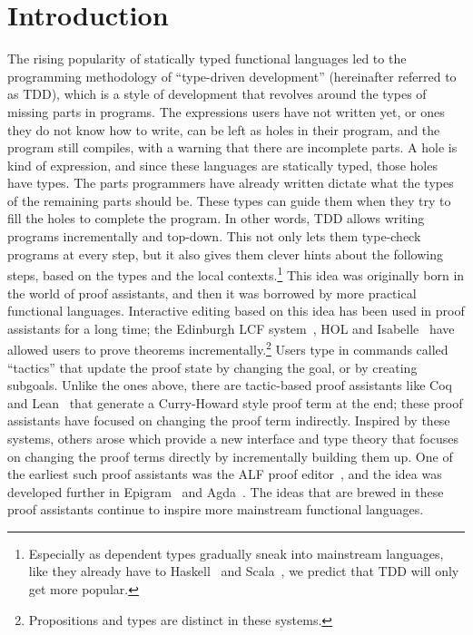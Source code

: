 \chapter{Introduction} \label{chap:introduction}

The rising popularity of statically typed functional languages led to
the programming methodology of ``type-driven development'' (hereinafter referred to as TDD),
which is a style of development that revolves around the types of missing parts in
programs. The expressions users have not written yet, or ones they do not know
how to write, can be left as holes in their program, and the program still
compiles, with a warning that there are incomplete parts.
A hole is kind of expression, and since these languages are
statically typed, those holes have types. The parts
programmers have already written dictate what the types of the remaining parts should
be. These types can guide them when they try to fill the holes to complete the program.
In other words, TDD allows writing programs incrementally and top-down. This
not only lets them type-check programs at every step, but it also gives them clever
hints about the following steps, based on the types and the local
contexts.\footnote{Especially as dependent types gradually sneak into
mainstream languages, like they already have to Haskell~\cite{eisenberg} and
Scala~\cite{scalaDep}, we predict that TDD will only get more popular.}
This idea was originally born in the world of proof assistants, and then it was
borrowed by more practical functional languages.
Interactive editing based on this idea has been used in proof assistants for a long
time; the Edinburgh LCF system~\cite{lcf}, HOL and
Isabelle~\cite{isabelle} have allowed users to prove theorems
incrementally.\footnote{Propositions and types are distinct in these systems.}
Users type in commands called ``tactics'' that update the proof state by
changing the goal, or by creating subgoals.
Unlike the ones above, there are tactic-based proof assistants like
Coq~\cite{coq} and Lean~\cite{lean} that generate a Curry-Howard style proof term at the end; these
proof assistants have focused on changing the proof term indirectly.
Inspired by these systems, others arose which
provide a new interface and type theory that focuses on
changing the proof terms directly by incrementally building them
up.
One of the earliest such proof assistants was the ALF proof
editor~\cite{ALF}, and the idea was developed further in Epigram~\cite{epigram}
and Agda~\cite{agda}.
The ideas that are brewed in these proof assistants continue to inspire more
mainstream functional languages.

